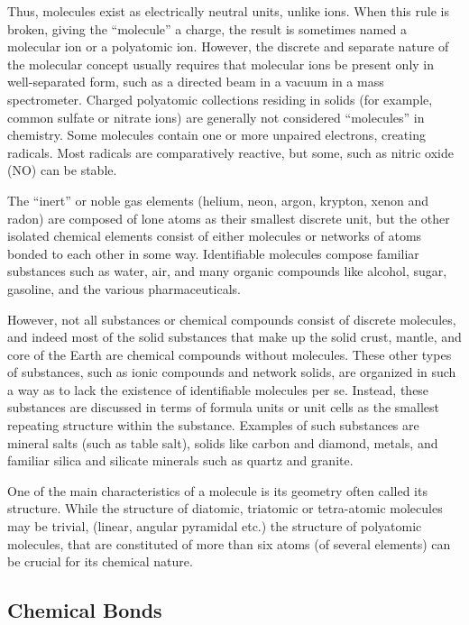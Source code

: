 \documentclass[
]{book}
\begin{document}
Thus, molecules exist as electrically neutral units, unlike ions. When this rule is broken, giving the ``molecule'' a charge, the result is sometimes named a molecular ion or a polyatomic ion. However, the discrete and separate nature of the molecular concept usually requires that molecular ions be present only in well-separated form, such as a directed beam in a vacuum in a mass spectrometer. Charged polyatomic collections residing in solids (for example, common sulfate or nitrate ions) are generally not considered ``molecules'' in chemistry. Some molecules contain one or more unpaired electrons, creating radicals. Most radicals are comparatively reactive, but some, such as nitric oxide (NO) can be stable.

The ``inert'' or noble gas elements (helium, neon, argon, krypton, xenon and radon) are composed of lone atoms as their smallest discrete unit, but the other isolated chemical elements consist of either molecules or networks of atoms bonded to each other in some way. Identifiable molecules compose familiar substances such as water, air, and many organic compounds like alcohol, sugar, gasoline, and the various pharmaceuticals.

However, not all substances or chemical compounds consist of discrete molecules, and indeed most of the solid substances that make up the solid crust, mantle, and core of the Earth are chemical compounds without molecules. These other types of substances, such as ionic compounds and network solids, are organized in such a way as to lack the existence of identifiable molecules per se. Instead, these substances are discussed in terms of formula units or unit cells as the smallest repeating structure within the substance. Examples of such substances are mineral salts (such as table salt), solids like carbon and diamond, metals, and familiar silica and silicate minerals such as quartz and granite.

One of the main characteristics of a molecule is its geometry often called its structure. While the structure of diatomic, triatomic or tetra-atomic molecules may be trivial, (linear, angular pyramidal etc.) the structure of polyatomic molecules, that are constituted of more than six atoms (of several elements) can be crucial for its chemical nature.

\hypertarget{chemical-bonds}{%
\subsection{Chemical Bonds}\label{chemical-bonds}}
\end{document}
